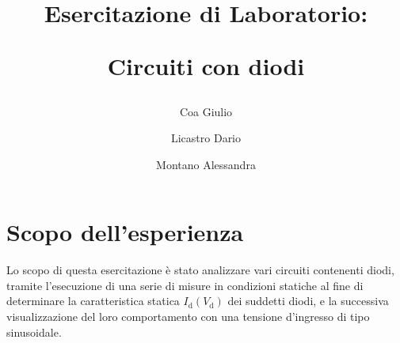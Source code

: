 \documentclass[a4paper]{article}
\title{
		\begin{center}
			Esercitazione di Laboratorio:
		\end{center}
		\newline
		\begin{center}
			Circuiti con diodi
		\end{center}
	}
\author{
			Coa Giulio
			\and
			Licastro Dario
			\and
			Montano Alessandra
		}
\begin{document}
	\begin{titlingpage}
		\maketitle
	\end{titlingpage}
	\newpage
	\section{Scopo dell'esperienza}
		Lo scopo di questa esercitazione è stato analizzare vari circuiti contenenti diodi, tramite l’esecuzione di una serie di misure in condizioni statiche al fine di determinare la caratteristica statica $ I_{\mathrm{d}}(V_{\mathrm{d}}) $ dei suddetti diodi, e la successiva visualizzazione del loro comportamento con una tensione d'ingresso di tipo sinusoidale.
\end{document}
